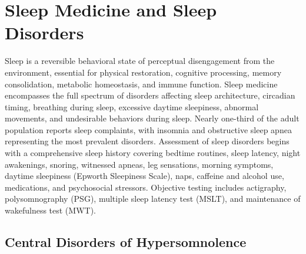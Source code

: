 \chapter{Sleep Medicine and Sleep Disorders}
\label{ch:sleep}
Sleep is a reversible behavioral state of perceptual disengagement from the environment, essential for physical restoration, cognitive processing, memory consolidation, metabolic homeostasis, and immune function. Sleep medicine encompasses the full spectrum of disorders affecting sleep architecture, circadian timing, breathing during sleep, excessive daytime sleepiness, abnormal movements, and undesirable behaviors during sleep. Nearly one-third of the adult population reports sleep complaints, with insomnia and obstructive sleep apnea representing the most prevalent disorders. Assessment of sleep disorders begins with a comprehensive sleep history covering bedtime routines, sleep latency, night awakenings, snoring, witnessed apneas, leg sensations, morning symptoms, daytime sleepiness (Epworth Sleepiness Scale), naps, caffeine and alcohol use, medications, and psychosocial stressors. Objective testing includes actigraphy, polysomnography (PSG), multiple sleep latency test (MSLT), and maintenance of wakefulness test (MWT).

\section{Central Disorders of Hypersomnolence}








\label{sec:Central Disorders of Hypersomnolence}

